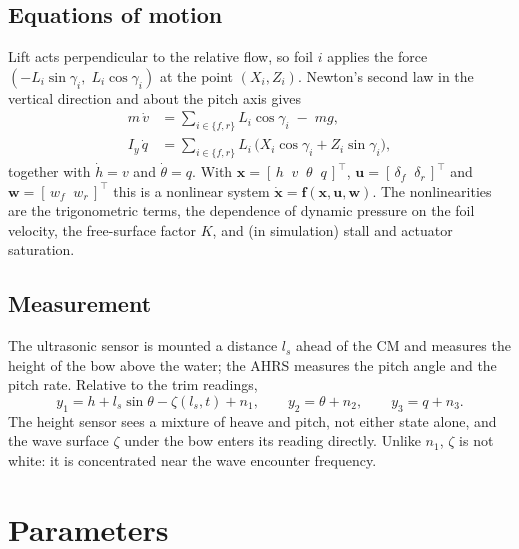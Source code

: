 \documentclass[11pt,a4paper]{article}
\newcommand{\T}{^{\top}}
\newcommand{\df}{\delta_f}
\newcommand{\dr}{\delta_r}
\begin{document}
\subsection{Equations of motion}

Lift acts perpendicular to the relative flow, so foil $i$ applies the force
$(-L_i\sin\gamma_i,\;L_i\cos\gamma_i)$ at the point $(X_i,Z_i)$. Newton's second
law in the vertical direction and about the pitch axis gives
\begin{align}
m\,\dot v &= \sum_{i\in\{f,r\}} L_i\cos\gamma_i \;-\; m g, \label{eq:heave}\\
I_y\,\dot q &= \sum_{i\in\{f,r\}} L_i\,\bigl(X_i\cos\gamma_i + Z_i\sin\gamma_i\bigr),
\label{eq:pitch}
\end{align}
together with $\dot h=v$ and $\dot\theta=q$. With
$\bm x=[\,h\;\;v\;\;\theta\;\;q\,]\T$, $\bm u=[\,\df\;\;\dr\,]\T$ and
$\bm w=[\,w_f\;\;w_r\,]\T$ this is a nonlinear system
$\dot{\bm x}=\bm f(\bm x,\bm u,\bm w)$. The nonlinearities are the trigonometric
terms, the dependence of dynamic pressure on the foil velocity, the free-surface
factor $K$, and (in simulation) stall and actuator saturation.

\subsection{Measurement}

The ultrasonic sensor is mounted a distance $l_s$ ahead of the CM and measures
the height of the bow above the water; the AHRS measures the pitch angle and the
pitch rate. Relative to the trim readings,
\begin{equation}
y_1 = h + l_s\sin\theta - \zeta(l_s,t) + n_1, \qquad y_2 = \theta + n_2, \qquad y_3 = q + n_3 .
\label{eq:meas}
\end{equation}
The height sensor sees a mixture of heave and pitch, not either state alone,
and the wave surface $\zeta$ under the bow enters its reading directly. Unlike
$n_1$, $\zeta$ is not white: it is concentrated near the wave encounter
frequency.

\section{Parameters}
\label{sec:params}
\end{document}

